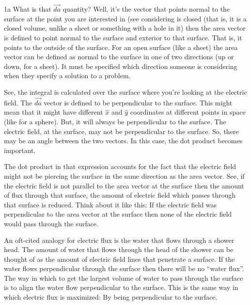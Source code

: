 \begin{homeworkProblem}[Quiz 3, Pr. 1]
\begin{homeworkSection}{1a}
        What is that $\vec{da}$ quantity? Well, it's the vector that
        points normal to the surface at the point you are interested in
        (see %
        considering is closed (that is, it is a closed volume, unlike a
        sheet or something with a hole in it) then the area vector is
        defined to point normal to the surface and exterior to that
        surface. That is, it points to the outside of the surface. For
        an open surface (like a sheet) the area vector can be defined as
        normal to the surface in one of two directions (up or down, for
        a sheet). It must be specified which direction someone is
        considering when they specify a solution to a problem.
        
        See, the integral is calculated over the surface where you're
        looking at the electric field. The $\vec{da}$ vector is defined
        to be perpendicular to the surface. This might mean that it
        might have different $\hat{x}$ and $\hat{y}$ coordinates at
        different points in space (like for a sphere). But, it will
        always be perpendicular to the surface. The electric field, at
        the surface, may not be perpendicular to the surface. So, there
        may be an angle between the two vectors. In this case, the dot
        product becomes important.

        The dot product in that expression accounts for the fact that
        the electric field might not be piercing the surface in the same
        direction as the area vector. See, if the electric field is not
        parallel to the area vector at the surface %
        then the amount of flux through that surface, the amount of
        electric field which passes through that surface is reduced.
        Think about it like this: If the electric field was
        perpendicular to the area vector at the surface then none of the
        electric field would pass through the surface.
        
        An oft-cited analogy for electric flux is the water that flows
        through a shower head. The amount of water that flows through
        the head of the shower can be thought of as the amount of
        electric field lines that penetrate a surface. If the water
        flows perpendicular through the surface then there will be no
        ``water flux''. The way in which to get the largest volume of
        water to pass through the surface is to align the water flow
        perpendicular to the surface. This is the same way in which
        electric flux is maximized: By being perpendicular to the
        surface.


\end{homeworkSection}
\end{homeworkProblem}
